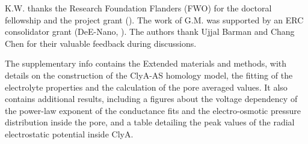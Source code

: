 \documentclass[journal=ancac3,manuscript=article,etalmode=truncate,maxauthors=0,layout=twocolumn]{achemso}
\begin{document}
\begin{acknowledgement}
K.W. thanks the Research Foundation Flanders (FWO) for the doctoral fellowship and the project grant
(). The work of G.M. was supported by an ERC consolidator grant (DeE-Nano, ).
The authors thank Ujjal Barman and Chang Chen for their valuable feedback during discussions.
\end{acknowledgement}

\begin{suppinfo}
	The supplementary info contains the Extended materials and methods, with details on the construction of the
	ClyA-AS homology model, the fitting of the electrolyte properties and the calculation of the pore averaged
	values. It also contains additional results, including a figures about the voltage dependency of the
	power-law exponent of the conductance fits and the electro-osmotic pressure distribution inside the pore,
	and a table detailing the peak values of the radial electrostatic potential inside ClyA.
\end{suppinfo}



%
\end{document}
